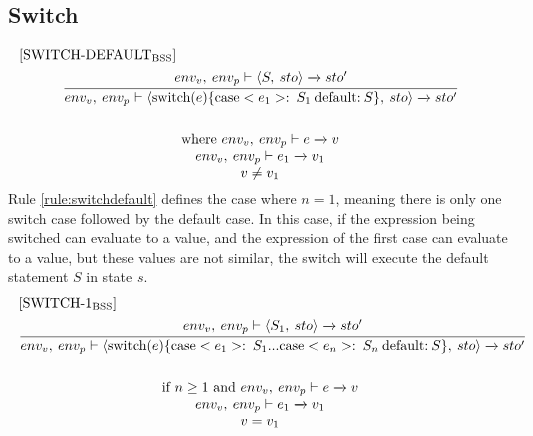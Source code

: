 \subsection*{Switch}
\begin{equation}\label{rule:switchdefault}
\begin{split}
\begin{minipage}{\linewidth}
$[\text{SWITCH-DEFAULT}_\text{BSS}]$
\end{minipage}
\\
\begin{minipage}{\linewidth}
\centering
$\cfrac{env_v, \: env_p \vdash \langle S, \: sto \rangle \xrightarrow{} sto'}{env_v, \: env_p \vdash \langle \text{switch}(e) \{\text{case} <e_1>: \: S_1  \: \text{default:} \: S\}, \: sto \rangle \xrightarrow{} sto' }$ 
\end{minipage}
\\\\
\begin{minipage}{\linewidth}
\centering
where $env_v, \: env_p \vdash e \xrightarrow{} v$
\\
$env_v, \: env_p \vdash e_1 \xrightarrow{} v_1$
\\
$v \neq v_1$
\end{minipage}
\end{split}
\end{equation}
Rule \ref{rule:switchdefault} defines the case where $n=1$, meaning there is only one switch case followed by the default case. In this case, if the expression being switched can evaluate to a value, and the expression of the first case can evaluate to a value, but these values are not similar, the switch will execute the default statement $S$ in state $s$.
\begin{equation}\label{rule:switch1bss}
\begin{split}
\begin{minipage}{\linewidth}
$[\text{SWITCH-1}_\text{BSS}]$
\end{minipage}
\\
\begin{minipage}{\linewidth}
\centering
$\cfrac
{
    env_v, \: env_p \vdash \langle S_1, \: sto \rangle \xrightarrow{} sto'
}
{
   env_v, \: env_p \vdash \langle \text{switch}(e) \{\text{case} <e_1>: \: S_1 ... \text{case} <e_n>: \: S_n \: \text{default:} \: S\}, \: sto \rangle \xrightarrow{} sto' 
}
$ 
\end{minipage}
\\\\
\begin{minipage}{\linewidth}
\centering
if $ n \geq 1$ and $env_v, \: env_p \vdash e \xrightarrow{} v$
\\
$env_v, \: env_p \vdash e_1 \xrightarrow{} v_1$
\\
$v = v_1$
\end{minipage}
\end{split}
\end{equation}
